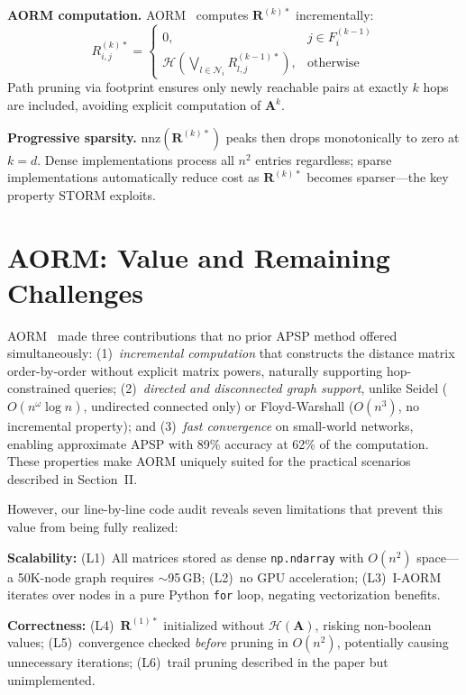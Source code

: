\documentclass[journal]{IEEEtran}
\begin{document}
\textbf{AORM computation.} AORM~\cite{aorm2021} computes $\mathbf{R}^{(k)*}$ incrementally:
\begin{equation}
  R^{(k)*}_{i,j} = \begin{cases}
    0, & j \in F_i^{(k-1)} \\
    \mathcal{H}\!\left(\bigvee_{l \in \mathcal{N}_i} R^{(k-1)*}_{l,j}\right), & \text{otherwise}
  \end{cases}
\end{equation}
Path pruning via footprint ensures only newly reachable pairs at exactly $k$ hops are included, avoiding explicit computation of $\mathbf{A}^k$.

\textbf{Progressive sparsity.} $\text{nnz}(\mathbf{R}^{(k)*})$ peaks then drops monotonically to zero at $k = d$. Dense implementations process all $n^2$ entries regardless; sparse implementations automatically reduce cost as $\mathbf{R}^{(k)*}$ becomes sparser---the key property STORM exploits.


\section{AORM: Value and Remaining Challenges}
\label{sec:limits}

AORM~\cite{aorm2021} made three contributions that no prior APSP method offered simultaneously: (1)~\emph{incremental computation} that constructs the distance matrix order-by-order without explicit matrix powers, naturally supporting hop-constrained queries; (2)~\emph{directed and disconnected graph support}, unlike Seidel ($O(n^\omega\!\log n)$, undirected connected only) or Floyd-Warshall ($O(n^3)$, no incremental property); and (3)~\emph{fast convergence} on small-world networks, enabling approximate APSP with 89\% accuracy at 62\% of the computation. These properties make AORM uniquely suited for the practical scenarios described in Section~II.

However, our line-by-line code audit reveals seven limitations that prevent this value from being fully realized:

\textbf{Scalability:} (L1)~All matrices stored as dense \texttt{np.ndarray} with $O(n^2)$ space---a 50K-node graph requires $\sim$95\,GB; (L2)~no GPU acceleration; (L3)~I-AORM iterates over nodes in a pure Python \texttt{for} loop, negating vectorization benefits.

\textbf{Correctness:} (L4)~$\mathbf{R}^{(1)*}$ initialized without $\mathcal{H}(\mathbf{A})$, risking non-boolean values; (L5)~convergence checked \emph{before} pruning in $O(n^2)$, potentially causing unnecessary iterations; (L6)~trail pruning described in the paper but unimplemented.
\end{document}

